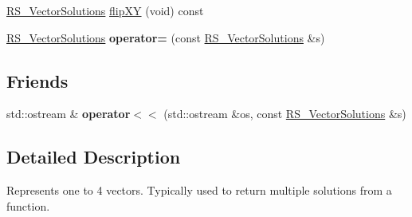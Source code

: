 \begin{DoxyCompactItemize}
\item 
\hyperlink{classRS__VectorSolutions}{R\-S\-\_\-\-Vector\-Solutions} \hyperlink{classRS__VectorSolutions_a59175011eb43b9bb832418fa93568315}{flip\-X\-Y} (void) const 
\item 
\hypertarget{classRS__VectorSolutions_a5a27d7083459e4e320aad63cd8f56cf9}{\hyperlink{classRS__VectorSolutions}{R\-S\-\_\-\-Vector\-Solutions} {\bfseries operator=} (const \hyperlink{classRS__VectorSolutions}{R\-S\-\_\-\-Vector\-Solutions} \&s)}\label{classRS__VectorSolutions_a5a27d7083459e4e320aad63cd8f56cf9}

\end{DoxyCompactItemize}
\subsection*{Friends}
\begin{DoxyCompactItemize}
\item 
\hypertarget{classRS__VectorSolutions_a11ff2384942c9769cfa74ab6f89fa151}{std\-::ostream \& {\bfseries operator$<$$<$} (std\-::ostream \&os, const \hyperlink{classRS__VectorSolutions}{R\-S\-\_\-\-Vector\-Solutions} \&s)}\label{classRS__VectorSolutions_a11ff2384942c9769cfa74ab6f89fa151}

\end{DoxyCompactItemize}


\subsection{Detailed Description}
Represents one to 4 vectors. Typically used to return multiple solutions from a function. 

